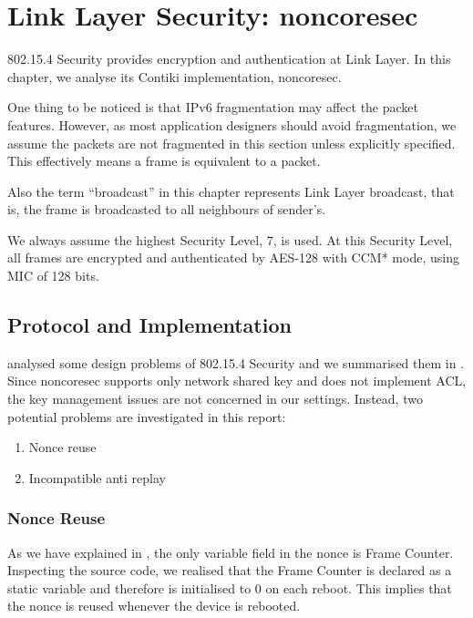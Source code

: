 \chapter{Link Layer Security: noncoresec} \label{Chp: LLSEC}

802.15.4 Security provides encryption and authentication at Link Layer. In this chapter, we analyse its Contiki implementation, noncoresec.

One thing to be noticed is that IPv6 fragmentation may affect the packet features. However, as most application designers should avoid fragmentation, we assume the packets are not fragmented in this section unless explicitly specified. This effectively means a frame is equivalent to a packet.

Also the term ``broadcast'' in this chapter represents Link Layer broadcast, that is, the frame is broadcasted to all neighbours of sender's.

We always assume the highest Security Level, $7$, is used. At this Security Level, all frames are encrypted and authenticated by AES-128 with CCM* mode, using MIC of 128 bits.

\section{Protocol and Implementation}

\cite{802154sec} analysed some design problems of 802.15.4 Security and  we summarised them in . Since noncoresec supports only network shared key and does not implement ACL, the key management issues are not concerned in our settings. Instead, two potential problems are investigated in this report:

\begin{enumerate}
	\item Nonce reuse
	\item Incompatible anti replay
\end{enumerate}

\subsection{Nonce Reuse}

As we have explained in , the only variable field in the nonce is Frame Counter. Inspecting the source code, we realised that the Frame Counter is declared as a static variable and therefore is initialised to $0$ on each reboot. This implies that the nonce is reused whenever the device is rebooted.

